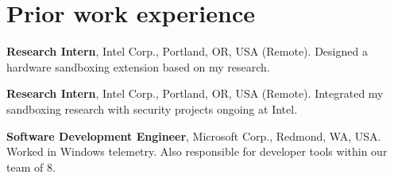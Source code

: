 \section{Prior work experience}

%
{{\textbf{Research Intern}, Intel Corp., Portland, OR, USA (Remote).}
%
{\hfill \newline Designed a hardware sandboxing extension based on my research.}}

%
{{\textbf{Research Intern}, Intel Corp., Portland, OR, USA (Remote).}
%
{\hfill \newline Integrated my sandboxing research with security projects
ongoing at Intel.}}

%
{{\textbf{Software Development Engineer}, Microsoft Corp., Redmond, WA, USA.}
%
{\hfill \newline Worked in Windows telemetry. Also responsible for developer
tools within our team of 8.}}